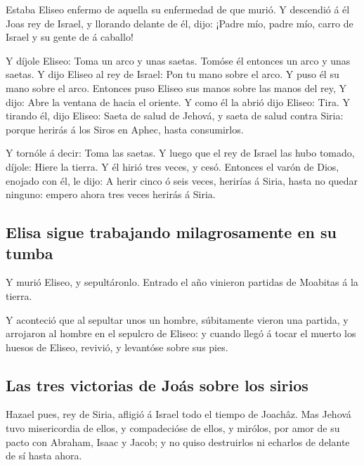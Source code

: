  Estaba Eliseo enfermo de aquella su enfermedad de que
murió. Y descendió á él Joas rey de Israel, y llorando delante de él,
dijo: ¡Padre mío, padre mío, carro de Israel y su gente de á caballo!

 Y díjole Eliseo: Toma un arco y unas saetas. Tomóse él
entonces un arco y unas saetas.  Y dijo Eliseo al rey de
Israel: Pon tu mano sobre el arco. Y puso él su mano sobre el arco.
Entonces puso Eliseo sus manos sobre las manos del rey, 
Y dijo: Abre la ventana de hacia el oriente. Y como él la abrió dijo
Eliseo: Tira. Y tirando él, dijo Eliseo: Saeta de salud de Jehová, y
saeta de salud contra Siria: porque herirás á los Siros en Aphec, hasta
consumirlos.

 Y tornóle á decir: Toma las saetas. Y luego que el rey
de Israel las hubo tomado, díjole: Hiere la tierra. Y él hirió tres
veces, y cesó.  Entonces el varón de Dios, enojado con
él, le dijo: A herir cinco ó seis veces, herirías á Siria, hasta no
quedar ninguno: empero ahora tres veces herirás á Siria.

\hypertarget{elisa-sigue-trabajando-milagrosamente-en-su-tumba}{%
\subsection{Elisa sigue trabajando milagrosamente en su
tumba}\label{elisa-sigue-trabajando-milagrosamente-en-su-tumba}}

 Y murió Eliseo, y sepultáronlo. Entrado el año vinieron
partidas de Moabitas á la tierra.

 Y aconteció que al sepultar unos un hombre, súbitamente
vieron una partida, y arrojaron al hombre en el sepulcro de Eliseo: y
cuando llegó á tocar el muerto los huesos de Eliseo, revivió, y
levantóse sobre sus pies.

\hypertarget{las-tres-victorias-de-jouxe1s-sobre-los-sirios}{%
\subsection{Las tres victorias de Joás sobre los
sirios}\label{las-tres-victorias-de-jouxe1s-sobre-los-sirios}}

 Hazael pues, rey de Siria, afligió á Israel todo el
tiempo de Joachâz.  Mas Jehová tuvo misericordia de
ellos, y compadecióse de ellos, y mirólos, por amor de su pacto con
Abraham, Isaac y Jacob; y no quiso destruirlos ni echarlos de delante de
sí hasta ahora.

